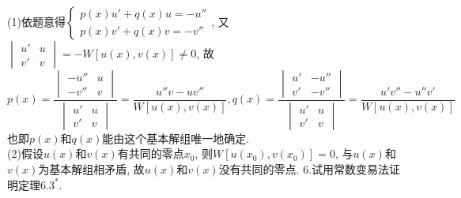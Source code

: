 \documentclass[titlepage,11pt,a4paper,twoside]{report}
\makeatletter
\renewenvironment{proof}{\par
	\pushQED{\qed}%
	\normalfont \topsep1\p@\@plus6\p@\relax
	\trivlist
	\item\relax
	{\hspace*{\parindent}{\heiti 证明}\@addpunct{:}}\hspace\labelsep\ignorespaces
}{%
	\popQED\endtrivlist\@endpefalse
}
\makeatother
\begin{document}
\begin{proof}
(1)依题意得$\begin{cases}p(x)u'+q(x)u=-u''\\p(x)v'+q(x)v=-v''\end{cases}$, 又$\begin{vmatrix}u'&u\\v'&v\end{vmatrix}=-W[u(x),v(x)]\neq0$, 故
\[p(x)=\frac{\begin{vmatrix}-u''&u\\-v''&v\end{vmatrix}}{\begin{vmatrix}u'&u\\v'&v\end{vmatrix}}=\frac{u''v-uv''}{W[u(x),v(x)]},q(x)=\frac{\begin{vmatrix}u'&-u''\\v'&-v''\end{vmatrix}}{\begin{vmatrix}u'&u\\v'&v\end{vmatrix}}=\frac{u'v''-u''v'}{W[u(x),v(x)]}\]
也即$p(x)$和$q(x)$能由这个基本解组唯一地确定.\\
(2)假设$u(x)$和$v(x)$有共同的零点$x_0$, 则$W[u(x_0),v(x_0)]=0$, 与$u(x)$和$v(x)$为基本解组相矛盾, 故$u(x)$和$v(x)$没有共同的零点.
\end{proof}
6.试用常数变易法证明定理$6.3^*$.
\end{document}
